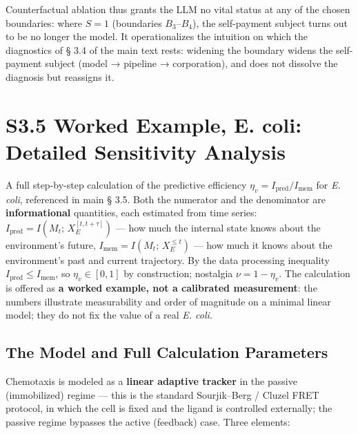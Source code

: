 \documentclass[pdflatex,sn-mathphys-ay]{sn-jnl}
\begin{document}
Counterfactual ablation thus grants the LLM no vital status at any of the chosen boundaries: where \(S = 1\) (boundaries \(B_3\)--\(B_4\)), the self-payment subject turns out to be no longer the model. It operationalizes the intuition on which the diagnostics of § 3.4 of the main text rests: widening the boundary widens the self-payment subject (model → pipeline → corporation), and does not dissolve the diagnosis but reassigns it.

\section*{S3.5 Worked Example, E. coli: Detailed Sensitivity Analysis}\label{s3.5-worked-example-e.-coli-detailed-sensitivity-analysis}

A full step-by-step calculation of the predictive efficiency \(\eta_v = I_{\text{pred}}/I_{\text{mem}}\) for \emph{E. coli}, referenced in main § 3.5. Both the numerator and the denominator are \textbf{informational} quantities, each estimated from time series: \(I_{\text{pred}} = I(M_t;\, X_E^{[t, t+\tau]})\) --- how much the internal state knows about the environment's future, \(I_{\text{mem}} = I(M_t;\, X_E^{\le t})\) --- how much it knows about the environment's past and current trajectory. By the data processing inequality \(I_{\text{pred}} \le I_{\text{mem}}\), so \(\eta_v \in [0, 1]\) by construction; nostalgia \(\nu = 1 - \eta_v\). The calculation is offered as \textbf{a worked example, not a calibrated measurement}: the numbers illustrate measurability and order of magnitude on a minimal linear model; they do not fix the value of a real \emph{E. coli}.

\subsection*{The Model and Full Calculation Parameters}\label{the-model-and-full-calculation-parameters}

Chemotaxis is modeled as a \textbf{linear adaptive tracker} in the passive (immobilized) regime --- this is the standard Sourjik--Berg / Cluzel FRET protocol, in which the cell is fixed and the ligand is controlled externally; the passive regime bypasses the active (feedback) case. Three elements:
\end{document}
